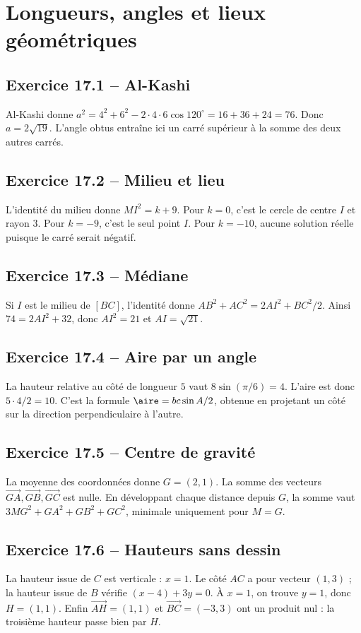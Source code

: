 \chapter{Longueurs, angles et lieux géométriques}
\section*{Exercice 17.1 -- Al-Kashi}
Al-Kashi donne $a^2=4^2+6^2-2\cdot4\cdot6\cos120^\circ=16+36+24=76$. Donc $a=2\sqrt{19}$. L'angle obtus entraîne ici un carré supérieur à la somme des deux autres carrés.

\section*{Exercice 17.2 -- Milieu et lieu}
L'identité du milieu donne $MI^2=k+9$. Pour $k=0$, c'est le cercle de centre $I$ et rayon $3$. Pour $k=-9$, c'est le seul point $I$. Pour $k=-10$, aucune solution réelle puisque le carré serait négatif.

\section*{Exercice 17.3 -- Médiane}
Si $I$ est le milieu de $[BC]$, l'identité donne $AB^2+AC^2=2AI^2+BC^2/2$. Ainsi $74=2AI^2+32$, donc $AI^2=21$ et $AI=\sqrt{21}$.

\section*{Exercice 17.4 -- Aire par un angle}
La hauteur relative au côté de longueur $5$ vaut $8\sin(\pi/6)=4$. L'aire est donc $5\cdot4/2=10$. C'est la formule $\aire=bc\sin A/2$, obtenue en projetant un côté sur la direction perpendiculaire à l'autre.

\section*{Exercice 17.5 -- Centre de gravité}
La moyenne des coordonnées donne $G=(2,1)$. La somme des vecteurs $\overrightarrow{GA},\overrightarrow{GB},\overrightarrow{GC}$ est nulle. En développant chaque distance depuis $G$, la somme vaut $3MG^2+GA^2+GB^2+GC^2$, minimale uniquement pour $M=G$.

\section*{Exercice 17.6 -- Hauteurs sans dessin}
La hauteur issue de $C$ est verticale : $x=1$. Le côté $AC$ a pour vecteur $(1,3)$ ; la hauteur issue de $B$ vérifie $(x-4)+3y=0$. À $x=1$, on trouve $y=1$, donc $H=(1,1)$. Enfin $\overrightarrow{AH}=(1,1)$ et $\overrightarrow{BC}=(-3,3)$ ont un produit nul : la troisième hauteur passe bien par $H$.
